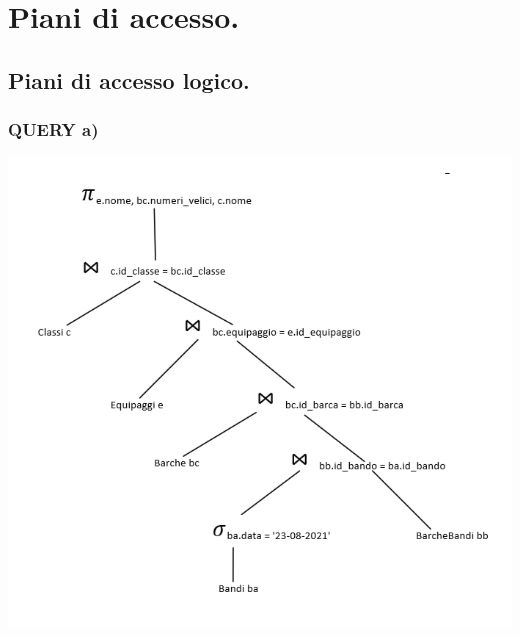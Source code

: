 \documentclass{article}
\begin{document}
\newpage
\section{Piani di accesso.}
\subsection{Piani di accesso logico.}

\subsubsection{QUERY a)}
\includegraphics[]{logicoa.png}
\end{document}
